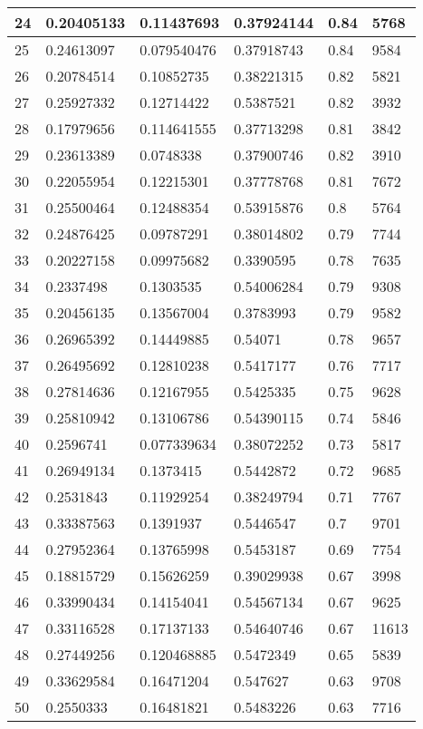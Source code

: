 \begin{longtable}{|l|l|l|l|l|l|}
24 & 0.20405133 & 0.11437693 & 0.37924144 & 0.84 & 5768 \\ \hline 
25 & 0.24613097 & 0.079540476 & 0.37918743 & 0.84 & 9584 \\ \hline 
26 & 0.20784514 & 0.10852735 & 0.38221315 & 0.82 & 5821 \\ \hline 
27 & 0.25927332 & 0.12714422 & 0.5387521 & 0.82 & 3932 \\ \hline 
28 & 0.17979656 & 0.114641555 & 0.37713298 & 0.81 & 3842 \\ \hline 
29 & 0.23613389 & 0.0748338 & 0.37900746 & 0.82 & 3910 \\ \hline 
30 & 0.22055954 & 0.12215301 & 0.37778768 & 0.81 & 7672 \\ \hline 
31 & 0.25500464 & 0.12488354 & 0.53915876 & 0.8 & 5764 \\ \hline 
32 & 0.24876425 & 0.09787291 & 0.38014802 & 0.79 & 7744 \\ \hline 
33 & 0.20227158 & 0.09975682 & 0.3390595 & 0.78 & 7635 \\ \hline 
34 & 0.2337498 & 0.1303535 & 0.54006284 & 0.79 & 9308 \\ \hline 
35 & 0.20456135 & 0.13567004 & 0.3783993 & 0.79 & 9582 \\ \hline 
36 & 0.26965392 & 0.14449885 & 0.54071 & 0.78 & 9657 \\ \hline 
37 & 0.26495692 & 0.12810238 & 0.5417177 & 0.76 & 7717 \\ \hline 
38 & 0.27814636 & 0.12167955 & 0.5425335 & 0.75 & 9628 \\ \hline 
39 & 0.25810942 & 0.13106786 & 0.54390115 & 0.74 & 5846 \\ \hline 
40 & 0.2596741 & 0.077339634 & 0.38072252 & 0.73 & 5817 \\ \hline 
41 & 0.26949134 & 0.1373415 & 0.5442872 & 0.72 & 9685 \\ \hline 
42 & 0.2531843 & 0.11929254 & 0.38249794 & 0.71 & 7767 \\ \hline 
43 & 0.33387563 & 0.1391937 & 0.5446547 & 0.7 & 9701 \\ \hline 
44 & 0.27952364 & 0.13765998 & 0.5453187 & 0.69 & 7754 \\ \hline 
45 & 0.18815729 & 0.15626259 & 0.39029938 & 0.67 & 3998 \\ \hline 
46 & 0.33990434 & 0.14154041 & 0.54567134 & 0.67 & 9625 \\ \hline 
47 & 0.33116528 & 0.17137133 & 0.54640746 & 0.67 & 11613 \\ \hline 
48 & 0.27449256 & 0.120468885 & 0.5472349 & 0.65 & 5839 \\ \hline 
49 & 0.33629584 & 0.16471204 & 0.547627 & 0.63 & 9708 \\ \hline 
50 & 0.2550333 & 0.16481821 & 0.5483226 & 0.63 & 7716 \\ \hline 
\end{longtable}